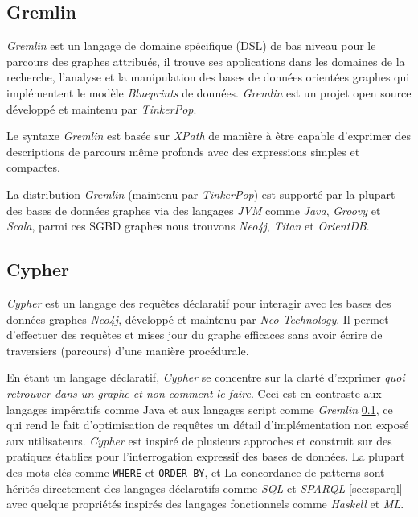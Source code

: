 \begin{itemize}
  \subsection{Gremlin}
  \label{sec:gremlin}
  \emph{Gremlin} \cite{gremlin-wiki} est un langage de domaine
  spécifique (\acrshort{DSL}) de bas niveau pour le parcours des
  graphes attribués, il trouve ses applications dans les domaines de
  la recherche, l'analyse et la manipulation des bases de données
  orientées graphes qui implémentent le modèle \emph{Blueprints}
  \cite{blueprints} de données. \emph{Gremlin} \cite{gremlin-wiki} est
  un projet open source développé et maintenu par \emph{TinkerPop}.

  Le syntaxe \emph{Gremlin} est basée sur \emph{XPath} de manière à
  être capable d'exprimer des descriptions de parcours même profonds
  avec des expressions simples et compactes.

  La distribution \emph{Gremlin} (maintenu par \emph{TinkerPop}) est
  supporté par la plupart des bases de données graphes via des
  langages \emph{JVM} comme \emph{Java}, \emph{Groovy} et
  \emph{Scala}, parmi ces \acrshort{SGBD} graphes nous trouvons
  \emph{Neo4j}, \emph{Titan} et \emph{OrientDB}.

  \subsection{Cypher}
  \label{sec:cypher}
  \emph{Cypher} \cite{cypher-docs} est un langage des requêtes
  déclaratif pour interagir avec les bases des données graphes
  \emph{Neo4j}, développé et maintenu par \emph{Neo Technology}. Il
  permet d'effectuer des requêtes et mises jour du graphe efficaces
  sans avoir écrire de traversiers (parcours) d'une manière
  procédurale.

  En étant un langage déclaratif, \emph{Cypher} se concentre sur la
  clarté d'exprimer \textit{quoi retrouver dans un graphe et non
    comment le faire}. Ceci est en contraste aux langages impératifs
  comme Java et aux langages script comme \emph{Gremlin}
  \ref{sec:gremlin}, ce qui rend le fait d'optimisation de requêtes un
  détail d'implémentation non exposé aux utilisateurs. \emph{Cypher}
  est inspiré de plusieurs approches et construit sur des pratiques
  établies pour l'interrogation expressif des bases de données. La
  plupart des mots clés comme \verb|WHERE| et \verb|ORDER BY|, et La
  concordance de patterns sont hérités directement des langages
  déclaratifs comme \emph{SQL} et \emph{SPARQL} \ref{sec:sparql} avec
  quelque propriétés inspirés des langages fonctionnels comme
  \emph{Haskell} et \emph{ML}.


\end{itemize}
